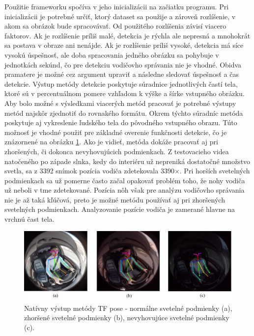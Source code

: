 \documentclass[slovak,master,dept460,male,cpp,cpdeclaration]{diploma}
\begin{document}
Použitie frameworku spočíva v jeho inicializácii na začiatku programu. Pri inicializácii je potrebné určiť, ktorý dataset sa použije a zároveň rozlíšenie, v akom  sa obrázok bude spracovávať. Od použitého rozlíšenia závisí viacero faktorov. Ak je rozlíšenie príliš malé, detekcia je rýchla ale nepresná a mnohokrát  sa postava v obraze ani nenájde. Ak je rozlíšenie príliš vysoké, detekcia má síce vysokú úspešnosť, ale doba spracovania  jedného obrázku sa  pohybuje v jednotkách sekúnd, čo pre detekciu vodičovho správania nie je vhodné. Obidva pramatere je možné cez argument upraviť a následne sledovať úspešnosť a čas detekcie. Výstup metódy detekcie poskytuje súradnice jednotlivých častí tela, ktoré sú v percentuálnom pomere vzhľadom k výške a šírke vstupného obrázku. Aby bolo možné s výsledkami viacerých metód pracovať je potrebné  výstupy metód najskôr zjednotiť do rovnakého formátu. Okrem týchto súradníc  metóda poskytuje  aj vykreslenie  ľudského tela do pôvodného vstupného obrazu. Túto možnosť je vhodné použiť pre základné overenie funkčnosti detekcie, čo je znázornené na obrázku \ref{fig:tfResult}. Ako je vidieť, metóda dokáže pracovať aj pri zhoršených, či dokonca nevyhovujúcich podmienkach. Z testovacieho videa natočeného po západe slnka, kedy do interiéru už nepreniká dostatočné množstvo svetla,  sa z 3392 snímok pozícia vodiča zdetekovala 3390$\times$. Pri horších svetelných podmienkach sa už pomerne často začal opakovať problém toho, že nohy vodiča už neboli v tme zdetekované. Pozícia nôh však pre analýzu vodičovho správania nie je až taká kľúčová, preto je možné metódu používať aj pri zhoršených svetelných podmienkach. Analyzovanie pozície vodiča je zamerané hlavne na vrchnú čast tela. 

\begin{figure}[H]
	\centering
	\includegraphics[width=1\textwidth]{Figures/tf_result.png}
	\caption{Natívny výstup metódy TF pose - normálne svetelné podmienky (a), zhoršené svetelné podmienky (b), nevyhovujúce svetelné podmienky (c).}
	\label{fig:tfResult}
\end{figure}
\end{document}
